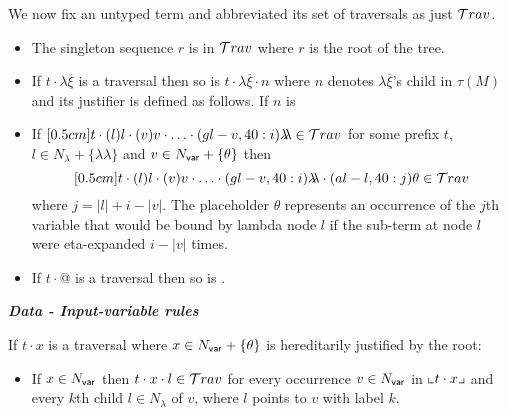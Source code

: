 \documentclass{article}
\theoremstyle{definition}
\newcommand\Nodes{N}%
\newcommand{\ghostlmd}{{\lambda\!\!\lambda}}
\newcommand{\ghostvar}{\theta}
\begin{document}
We now fix an untyped term and abbreviated its set of traversals as just $\mathcal{T}rav$.

\begin{FramedTable}
\begin{itemize}[]
\item{} The singleton sequence $r$ is in $\mathcal{T}rav$ where $r$ is the root of the tree.
\end{itemize}

\begin{itemize}[]
    \item {} If $t \cdot \lambda \overline{\xi}$ is a traversal then so is
        $t \cdot \lambda \overline{\xi} \cdot n$ where $n$
        denotes $\lambda \overline{\xi}$'s child in $\tau(M)$ and its justifier is defined as follows. If $n$ is
    \item \rulenamet{Lam^\ghostlmd} If
  $\Pstr[0.5cm]{ t \cdot(l){l} \cdot
(v){v} \cdot \ldots \cdot
(gl-v,40:i){\ghostlmd} \in\travset}$ for some prefix $t$, $l\in \Nodes_\lambda + \{\ghostlmd \}$ and $v\in\Nodes_{\sf var} + \{\ghostvar\}$ then
$$\Pstr[0.5cm]{ t \cdot(l){l} \cdot
(v){v}
\cdot \ldots \cdot
(gl-v,40:i){\ghostlmd}\cdot (al-l,40:j){\ghostvar}
     \in\travset}$$
 where $j = |l| + i - |v|$. The placeholder $\ghostvar$ represents an occurrence of the $j$th variable that would be bound by lambda node $l$ if the sub-term at node $l$ were eta-expanded $i-|v|$ times.


    \item {} If $t \cdot @$ is a traversal then so is .
\end{itemize}

\emph{\bf Data - Input-variable rules}

If $t \cdot x$ is a traversal where $x \in \Nodes_{\sf var} + \{\ghostvar \}$ is hereditarily justified by the root:
\begin{itemize}[]
\item {} If $x\in \Nodes_{\sf var}$ then
$t \cdot x \cdot l \in \mathcal{T}rav$ for every
occurrence $v \in \Nodes_{\sf var}$ in $\llcorner t\cdot x \lrcorner$ and every $k$th child $l \in \Nodes_\lambda$ of $v$, where $l$ points to $v$ with label $k$.


\end{itemize}
\end{FramedTable}
\end{document}

